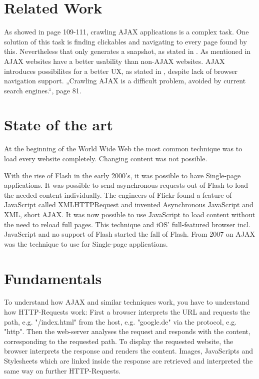 \documentclass[f,bachelor,binding,twoside,palatino]{WeSTthesis}
\def \ajax {AJAX}
\begin{document}
\section{Related Work}
  As showed in \cite{mesbah09} page 109-111, crawling \ajax{} applications is a complex task. One solution of this task is finding clickables and navigating to every page found by this. Nevertheless that only generates a snapshot, as stated in \cite[p. 124]{mesbah09}.
  As mentioned in \cite[p. 44]{roodt06} \ajax{} websites have a better usability than non-\ajax{} websites.
  \ajax{} introduces possibilites for a better UX, as stated in \cite{klugeKarglWeber07}, despite lack of browser navigation support.
  „Crawling \ajax{} is a difficult problem, avoided by current search engines.“\cite{matter08}, page 81.


\section{State of the art}
  At the beginning of the World Wide Web the most common technique was to load every website completely. Changing content was not possible.
    
  With the rise of Flash in the early 2000's, it was possible to have Single-page applications. It was possible to send asynchronous requests out of Flash to load the needed content individually.
  The engineers of Flickr found a feature of JavaScript called XMLHTTPRequest and invented Asynchronous JavaScript and XML, short \ajax{}. It was now possible to use JavaScript to load content without the need to reload full pages.
  This technique and iOS' full-featured browser incl. JavaScript and no support of Flash started the fall of Flash. From 2007 on \ajax{} was the technique to use for Single-page applications.
  
\section{Fundamentals}
  To understand how \ajax{} and similar techniques work, you have to understand how HTTP-Requests work:
  First a browser interprets the URL and requests the path, e.g. "/index.html" from the host, e.g. "google.de" via the protocol, e.g. "http".
  Then the web-server analyses the request and responds with the content, corresponding to the requested path.
  To display the requested website, the browser interprets the response and renders the content. 
  Images, JavaScripts and Stylesheets which are linked inside the response are retrieved and interpreted the same way on further HTTP-Requests.
\end{document}
